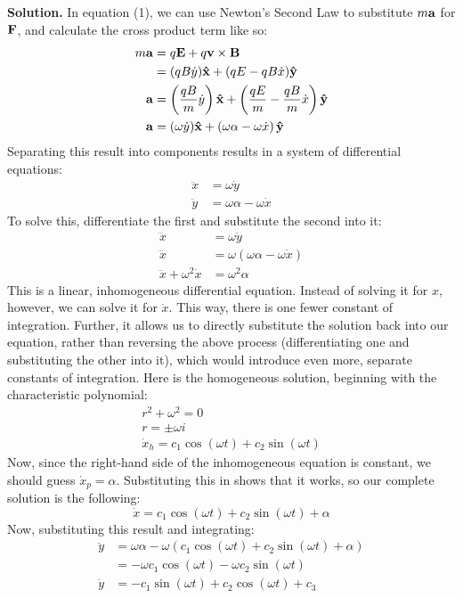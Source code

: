 \documentclass{article}
\begin{document}
\textbf{Solution.} In equation (1), we can use Newton's Second Law to substitute $m\vb{a}$ for $\vb{F}$, and calculate the cross product term like so:
\[
\begin{aligned}
    m\vb{a} &= q\vb{E} + q\vb{v}\times\vb{B} \\
    &= (qB\dot{y})\vu{x} + (qE - qB\dot{x})\vu{y} \\
    \vb{a} &= \left(\frac{qB}{m}\dot{y}\right)\vu{x} + \left(\frac{qE}{m} - \frac{qB}{m}\dot{x}\right)\vu{y} \\
    \vb{a} &= (\omega \dot{y})\vu{x} + \left(\omega \alpha - \omega \dot{x}\right)\vu{y}
\end{aligned}
\]
Separating this result into components results in a system of differential equations:
\[
\begin{aligned}
    \ddot{x} &= \omega \dot{y} \\
    \ddot{y} &= \omega \alpha - \omega \dot{x}
\end{aligned}
\]
To solve this, differentiate the first and substitute the second into it:
\[
\begin{aligned}
    \dddot{x} &= \omega \ddot{y} \\
    \dddot{x} &= \omega(\omega \alpha - \omega \dot{x}) \\
    \dddot{x} + {\omega}^2 \dot{x} &= {\omega}^2 \alpha
\end{aligned}
\]
This is a linear, inhomogeneous differential equation. Instead of solving it for $x$, however, we can solve it for $\dot{x}$. This way, there is one fewer constant of integration. Further, it allows us to directly substitute the solution back into our equation, rather than reversing the above process (differentiating one and substituting the other into it), which would introduce even more, separate constants of integration. Here is the homogeneous solution, beginning with the characteristic polynomial:
\begin{gather*}
    {r}^2 + {\omega}^2 = 0 \\
    r = \pm \omega i \\
    \dot{x}_h = c_1 \cos(\omega t) + c_2 \sin(\omega t)
\end{gather*}
Now, since the right-hand side of the inhomogeneous equation is constant, we should guess $\dot{x}_p = \alpha$. Substituting this in shows that it works, so our complete solution is the following:
\[
    \dot{x} = c_1 \cos(\omega t) + c_2 \sin(\omega t) + \alpha
\]
Now, substituting this result and integrating:
\[
\begin{aligned}
    \ddot{y} &= \omega \alpha - \omega (c_1 \cos(\omega t) + c_2 \sin(\omega t) + \alpha) \\
    &= -\omega c_1 \cos(\omega t) - \omega c_2 \sin(\omega t) \\
    \dot{y} &= -c_1 \sin(\omega t) + c_2 \cos(\omega t) + c_3
\end{aligned}
\]
\end{document}
